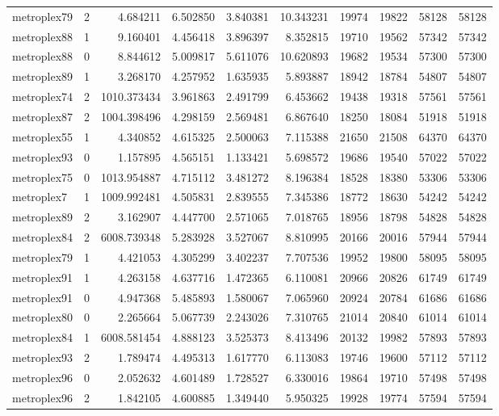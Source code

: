 \begin{longtable}{|l|r|r|r|r|r|r|r|r|r|}
metroplex79 & 2 & 4.684211 & 6.502850 & 3.840381 & 10.343231 & 19974 & 19822 & 58128 & 58128 \\
metroplex88 & 1 & 9.160401 & 4.456418 & 3.896397 & 8.352815 & 19710 & 19562 & 57342 & 57342 \\
metroplex88 & 0 & 8.844612 & 5.009817 & 5.611076 & 10.620893 & 19682 & 19534 & 57300 & 57300 \\
metroplex89 & 1 & 3.268170 & 4.257952 & 1.635935 & 5.893887 & 18942 & 18784 & 54807 & 54807 \\
metroplex74 & 2 & 1010.373434 & 3.961863 & 2.491799 & 6.453662 & 19438 & 19318 & 57561 & 57561 \\
metroplex87 & 2 & 1004.398496 & 4.298159 & 2.569481 & 6.867640 & 18250 & 18084 & 51918 & 51918 \\
metroplex55 & 1 & 4.340852 & 4.615325 & 2.500063 & 7.115388 & 21650 & 21508 & 64370 & 64370 \\
metroplex93 & 0 & 1.157895 & 4.565151 & 1.133421 & 5.698572 & 19686 & 19540 & 57022 & 57022 \\
metroplex75 & 0 & 1013.954887 & 4.715112 & 3.481272 & 8.196384 & 18528 & 18380 & 53306 & 53306 \\
metroplex7 & 1 & 1009.992481 & 4.505831 & 2.839555 & 7.345386 & 18772 & 18630 & 54242 & 54242 \\
metroplex89 & 2 & 3.162907 & 4.447700 & 2.571065 & 7.018765 & 18956 & 18798 & 54828 & 54828 \\
metroplex84 & 2 & 6008.739348 & 5.283928 & 3.527067 & 8.810995 & 20166 & 20016 & 57944 & 57944 \\
metroplex79 & 1 & 4.421053 & 4.305299 & 3.402237 & 7.707536 & 19952 & 19800 & 58095 & 58095 \\
metroplex91 & 1 & 4.263158 & 4.637716 & 1.472365 & 6.110081 & 20966 & 20826 & 61749 & 61749 \\
metroplex91 & 0 & 4.947368 & 5.485893 & 1.580067 & 7.065960 & 20924 & 20784 & 61686 & 61686 \\
metroplex80 & 0 & 2.265664 & 5.067739 & 2.243026 & 7.310765 & 21014 & 20840 & 61014 & 61014 \\
metroplex84 & 1 & 6008.581454 & 4.888123 & 3.525373 & 8.413496 & 20132 & 19982 & 57893 & 57893 \\
metroplex93 & 2 & 1.789474 & 4.495313 & 1.617770 & 6.113083 & 19746 & 19600 & 57112 & 57112 \\
metroplex96 & 0 & 2.052632 & 4.601489 & 1.728527 & 6.330016 & 19864 & 19710 & 57498 & 57498 \\
metroplex96 & 2 & 1.842105 & 4.600885 & 1.349440 & 5.950325 & 19928 & 19774 & 57594 & 57594 \\

\end{longtable}
